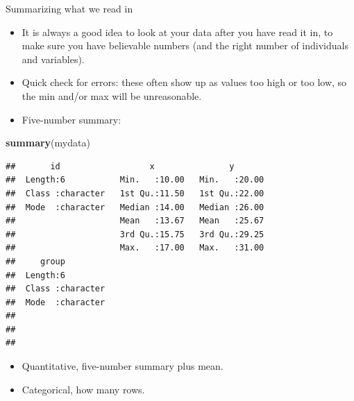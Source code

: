 \documentclass[ignorenonframetext,]{beamer}
\newenvironment{Shaded}{\begin{snugshade}}{\end{snugshade}}
\newcommand{\KeywordTok}[1]{\textcolor[rgb]{0.13,0.29,0.53}{\textbf{#1}}}
\newcommand{\NormalTok}[1]{#1}
\providecommand{\tightlist}{%
  \setlength{\itemsep}{0pt}\setlength{\parskip}{0pt}}
\begin{document}
\begin{frame}[fragile]{Summarizing what we read in}
\protect\hypertarget{summarizing-what-we-read-in}{}

\begin{itemize}
\tightlist
\item
  It is always a good idea to look at your data after you have read it
  in, to make sure you have believable numbers (and the right number of
  individuals and variables).
\item
  Quick check for errors: these often show up as values too high or too
  low, so the min and/or max will be unreasonable.
\item
  Five-number summary:
\end{itemize}

\begin{Shaded}
\begin{Highlighting}[]
\KeywordTok{summary}\NormalTok{(mydata)}
\end{Highlighting}
\end{Shaded}

\begin{verbatim}
##       id                  x               y        
##  Length:6           Min.   :10.00   Min.   :20.00  
##  Class :character   1st Qu.:11.50   1st Qu.:22.00  
##  Mode  :character   Median :14.00   Median :26.00  
##                     Mean   :13.67   Mean   :25.67  
##                     3rd Qu.:15.75   3rd Qu.:29.25  
##                     Max.   :17.00   Max.   :31.00  
##     group          
##  Length:6          
##  Class :character  
##  Mode  :character  
##                    
##                    
## 
\end{verbatim}

\begin{itemize}
\tightlist
\item
  Quantitative, five-number summary plus mean.
\item
  Categorical, how many rows.
\end{itemize}

\end{frame}
\end{document}
